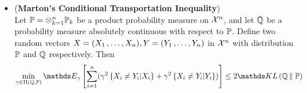 \documentclass[11pt]{article}
\begin{document}
\begin{itemize}
\begin{proof}
We want to prove the concentration using transportation cost inequality. That is, to bound the term
\begin{align*}
\min_{\gamma \in \Pi(\bQ, \bP)}\sum_{i=1}^{n}(\E{\gamma}{\ind{X_i \neq Y_i}})^2 = \min_{\gamma \in \Pi(\bQ, \bP)}\sum_{i=1}^{n}\gamma^2\set{X_i \neq Y_i}.
\end{align*} We have shown that 
\begin{align*}
\min_{\gamma \in \Pi(\bQ, \bP)}\gamma\set{X \neq Y} = \cW_{1, d_H}(\bQ, \bP) = \sup_{A \in \cX}\abs{\bQ(A) - \bP(A)}  \equiv \norm{\bQ - \bP}{TV}.
\end{align*}  For each independent variable $X_i, Y_i$, and their marginal distribution $\bP_i, \bQ_i$ where $\bQ_i \ll \bP_i$, by Pinsker's inequality,
\begin{align*}
 \min_{\gamma \in \Pi(\bQ_i, \bP_i)}\gamma\set{X_i \neq Y_i}  &\le \sqrt{\frac{1}{2}\kl{\bQ_i}{\bP_i}} \\
 \min_{\gamma \in \Pi(\bQ_i, \bP_i)}\gamma^2\set{X_i \neq Y_i} &\le \frac{1}{2}\kl{\bQ_i}{\bP_i}
\end{align*} Thus by induction lemma, 
\begin{align*}
\min_{\gamma \in \Pi(\bQ, \bP)}\sum_{i=1}^{n}\gamma^2\set{X_i \neq Y_i} &\le \frac{1}{2}\kl{\bQ}{\bP}
\end{align*} which is the \emph{Marton's transportation inequality}. Finally, we have
\begin{align*}
\E{\bQ}{f(Y)} - \E{\bP}{f(X)} &\le \paren{\sum_{i=1}^{n}L_i^2}^{1/2}\paren{\sum_{i=1}^{n}(\E{\gamma}{\ind{X_i \neq Y_i}})^2}^{1/2} \\
&\le \sqrt{\frac{\paren{\sum_{i=1}^{n}L_i^2}}{2}\kl{\bQ}{\bP}}.
\end{align*} Then we can apply the transportation lemma with $\nu := \frac{1}{4}\sum_{i=1}^{n}L_i^2$, which proves the bounded difference inequality. \qed 
\end{proof}

\item \begin{theorem} (\textbf{Marton's Conditional Transportation Inequality}) \citep{boucheron2013concentration}\\
Let ${\mathbb P} = \otimes_{k=1}^n {\mathbb P}_k$ be a product probability measure on ${\mathcal X}^n$, and let ${\mathbb Q}$ be a probability measure absolutely continuous with respect to ${\mathbb P}$. Define two random vectors $X = (X_1 \,{,}\ldots{,}\, X_n), Y = (Y_1 \,{,}\ldots{,}\, Y_n)$ in ${\mathcal X}^n$ with distribution ${\mathbb P}$ and ${\mathbb Q}$ respectively.  Then
\begin{align}
 \min_{\gamma \in \Pi(\bQ, \bP)}\E{\gamma}{\sum_{i=1}^n(\gamma^2\set{X_i \neq Y_i | X_i} + \gamma^2\set{X_i \neq Y_i | Y_i})} &\le 2\kl{\bQ}{\bP} \label{ineqn: marton_conditional_transport_cost_inequality}
\end{align}
\end{theorem}


\end{itemize}
\end{document}
